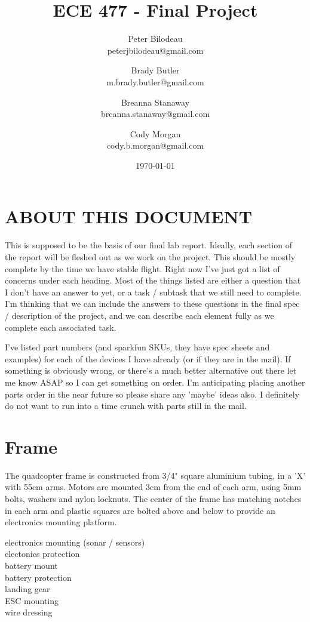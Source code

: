 \documentclass{article}
\begin{document}
\title{ECE 477 - Final Project}
\author{Peter Bilodeau\\
	peterjbilodeau@gmail.com\and
	Brady Butler\\
	m.brady.butler@gmail.com \and
	Breanna Stanaway\\
	breanna.stanaway@gmail.com\and
	Cody Morgan\\
	cody.b.morgan@gmail.com}
\date{\today}
\maketitle{}
\section{ABOUT THIS DOCUMENT}
This is supposed to be the basis of our final lab report.  Ideally, each section of the report will be fleshed out as we work on the project.  This should be mostly complete by the time we have stable flight.  Right now I've just got a list of concerns under each heading.  Most of the things listed are either a question that I don't have an answer to yet, or a task / subtask that we still need to complete.  I'm thinking that we can include the answers to these questions in the final spec / description of the project, and we can describe each element fully as we complete each associated task.

I've listed part numbers (and sparkfun SKUs, they have spec sheets and examples) for each of the devices I have already (or if they are in the mail).  If something is obviously wrong, or there's a much better alternative out there let me know ASAP so I can get something on order.  I'm anticipating placing another parts order in the near future so please share any 'maybe' ideas also.  I definitely do not want to run into a time crunch with parts still in the mail.

\section{Frame}
The quadcopter frame is constructed from 3/4" square aluminium tubing, in a 'X' with 55cm arms.  Motors are mounted 3cm from the end of each arm, using 5mm bolts, washers and nylon locknuts.  The center of the frame has matching notches in each arm and plastic squares are bolted above and below to provide an electronics mounting platform.

electronics mounting (sonar / sensors)\\
electonics protection\\
battery mount\\
battery protection\\
landing gear\\
ESC mounting\\
wire dressing\\
\end{document}
